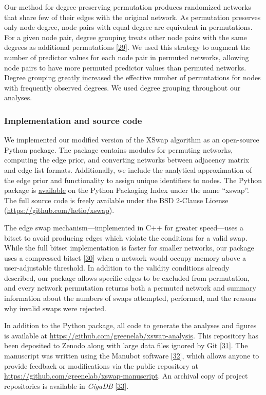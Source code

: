 Our method for degree-preserving permutation produces randomized networks that share few of their edges with the original network.
As permutation preserves only node degree, node pairs with equal degree are equivalent in permutations.
For a given node pair, degree grouping treats other node pairs with the same degrees as additional permutations {[}\protect\hyperlink{ref-vVd4u4Kx}{29}{]}.
We used this strategy to augment the number of predictor values for each node pair in permuted networks, allowing node pairs to have more permuted predictor values than permuted networks.
Degree grouping \href{https://github.com/greenelab/hetmech/pull/96}{greatly increased} the effective number of permutations for nodes with frequently observed degrees.
We used degree grouping throughout our analyses.

\hypertarget{implementation-and-source-code}{%
\subsubsection{Implementation and source code}\label{implementation-and-source-code}}

We implemented our modified version of the XSwap algorithm as an open-source Python package.
The package contains modules for permuting networks, computing the edge prior, and converting networks between adjacency matrix and edge list formats.
Additionally, we include the analytical approximation of the edge prior and functionality to assign unique identifiers to nodes.
The Python package is \href{https://pypi.org/project/xswap/}{available} on the Python Packaging Index under the name ``xswap''.
The full source code is freely available under the BSD 2-Clause License (\url{https://github.com/hetio/xswap}).

The edge swap mechanism---implemented in C++ for greater speed---uses a bitset to avoid producing edges which violate the conditions for a valid swap.
While the full bitset implementation is faster for smaller networks, our package uses a compressed bitset {[}\protect\hyperlink{ref-jNEBDktj}{30}{]} when a network would occupy memory above a user-adjustable threshold.
In addition to the validity conditions already described, our package allows specific edges to be excluded from permutation, and every network permutation returns both a permuted network and summary information about the numbers of swaps attempted, performed, and the reasons why invalid swaps were rejected.

In addition to the Python package, all code to generate the analyses and figures is available at \url{https://github.com/greenelab/xswap-analysis}.
This repository has been deposited to Zenodo along with large data files ignored by Git {[}\protect\hyperlink{ref-QUz6BIl8}{31}{]}.
The manuscript was written using the Manubot software {[}\protect\hyperlink{ref-YuJbg3zO}{32}{]}, which allows anyone to provide feedback or modifications via the public repository at \url{https://github.com/greenelab/xswap-manuscript}.
An archival copy of project repositories is available in \emph{GigaDB} {[}\protect\hyperlink{ref-61xTp8tx}{33}{]}.

